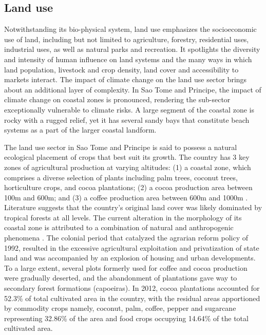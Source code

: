\documentclass[
]{book}
\begin{document}
\hypertarget{land-use-1}{%
\subsection{Land use}\label{land-use-1}}

Notwithstanding its bio-physical system, land use emphasizes the socioeconomic use of land, including but not limited to agriculture, forestry, residential uses, industrial uses, as well as natural parks and recreation. It spotlights the diversity and intensity of human influence on land systems and the many ways in which land population, livestock and crop density, land cover and accessibility to markets interact. The impact of climate change on the land use sector brings about an additional layer of complexity. In Sao Tome and Principe, the impact of climate change on coastal zones is pronounced, rendering the sub-sector exceptionally vulnerable to climate risks. A large segment of the coastal zone is rocky with a rugged relief, yet it has several sandy bays that constitute beach systems as a part of the larger coastal landform.

The land use sector in Sao Tome and Principe is said to possess a natural ecological placement of crops that best suit its growth. The country has 3 key zones of agricultural production at varying altitudes: (1) a coastal zone, which comprises a diverse selection of plants including palm trees, coconut trees, horticulture crops, and cocoa plantations; (2) a cocoa production area between 100m and 600m; and (3) a coffee production area between 600m and 1000m . Literature suggests that the country's original land cover was likely dominated by tropical forests at all levels. The current alteration in the morphology of its coastal zone is attributed to a combination of natural and anthropogenic phenomena . The colonial period that catalyzed the agrarian reform policy of 1992, resulted in the excessive agricultural exploitation and privatization of state land and was accompanied by an explosion of housing and urban developments. To a large extent, several plots formerly used for coffee and cocoa production were gradually deserted, and the abandonment of plantations gave way to secondary forest formations (capoeiras). In 2012, cocoa plantations accounted for 52.3\% of total cultivated area in the country, with the residual areas apportioned by commodity crops namely, coconut, palm, coffee, pepper and sugarcane representing 32.86\% of the area and food crops occupying 14.64\% of the total cultivated area.
\end{document}
